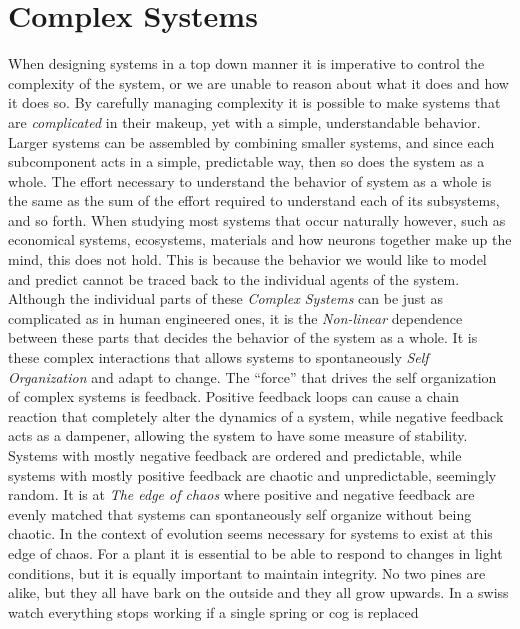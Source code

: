 \section{Complex Systems}
%
When designing systems in a top down manner it is imperative to control the
complexity of the system, or we are unable to reason about what it does and how
it does so.
By carefully managing complexity it is possible to make systems that are
\emph{complicated} in their makeup, yet with a simple, understandable behavior.
Larger systems can be assembled by combining smaller systems, and since each
subcomponent acts in a simple, predictable way, then so does the system as a
whole.
The effort necessary to understand the behavior of system as a whole is the same
as the sum of the effort required to understand each of its subsystems, and so
forth.
%
When studying most systems that occur naturally however, such as economical
systems, ecosystems, materials and how neurons together make up the mind, this
does not hold.
%
This is because the behavior we would like to model and predict cannot be traced
back to the individual agents of the system.
%
Although the individual parts of these \emph{Complex Systems} can be just as
complicated as in human engineered ones, it is the \emph{Non-linear} dependence
between these parts that decides the behavior of the system as a whole.
%
It is these complex interactions that allows systems to spontaneously \emph{Self
  Organization} and adapt to change.
%
The ``force'' that drives the self organization of complex systems is feedback.
Positive feedback loops can cause a chain reaction that completely alter the
dynamics of a system, while negative feedback acts as a dampener, allowing the
system to have some measure of stability.
Systems with mostly negative feedback are ordered and predictable, while systems
with mostly positive feedback are chaotic and unpredictable, seemingly random.
It is at \emph{The edge of chaos} where positive and negative feedback are
evenly matched that systems can spontaneously self organize without being chaotic.
%
In the context of evolution seems necessary for systems to exist at this edge of
chaos.
For a plant it is essential to be able to respond to changes in light
conditions, but it is equally important to maintain integrity.
No two pines are alike, but they all have bark on the outside and they all grow
upwards.
In a swiss watch everything stops working if a single spring or cog is replaced
